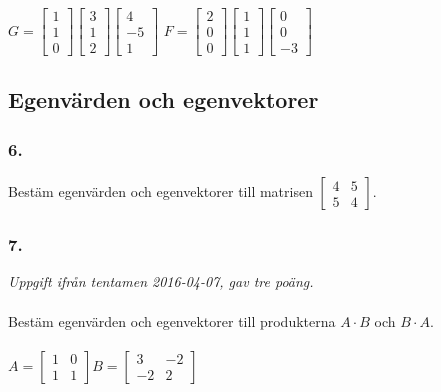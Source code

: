 \documentclass{article}
\begin{document}
\noindent
$G = \begin{bmatrix} 1 \\ 1 \\ 0 \end{bmatrix} \begin{bmatrix} 3 \\ 1 \\ 2 \end{bmatrix} \begin{bmatrix} 4 \\ -5 \\ 1 \end{bmatrix}$ $F = \begin{bmatrix} 2 \\ 0 \\ 0 \end{bmatrix} \begin{bmatrix} 1 \\ 1 \\ 1 \end{bmatrix} \begin{bmatrix} 0 \\ 0 \\ -3 \end{bmatrix}$ 

\newpage

\subsection*{Egenvärden och egenvektorer}
\subsubsection*{6.}
Bestäm egenvärden och egenvektorer till matrisen $\begin{bmatrix} 4 & 5 \\ 5 & 4 \end{bmatrix}$.

\subsubsection*{7.}
\textit{Uppgift ifrån tentamen 2016-04-07, gav tre poäng.} \\ \\ 
Bestäm egenvärden och egenvektorer till produkterna $A \cdot B$ och $B \cdot A$. \\ \\ 
$A = \begin{bmatrix} 1 & 0 \\ 1 & 1 \end{bmatrix} B = \begin{bmatrix} 3 & -2 \\ -2 & 2 \end{bmatrix}$
\end{document}
